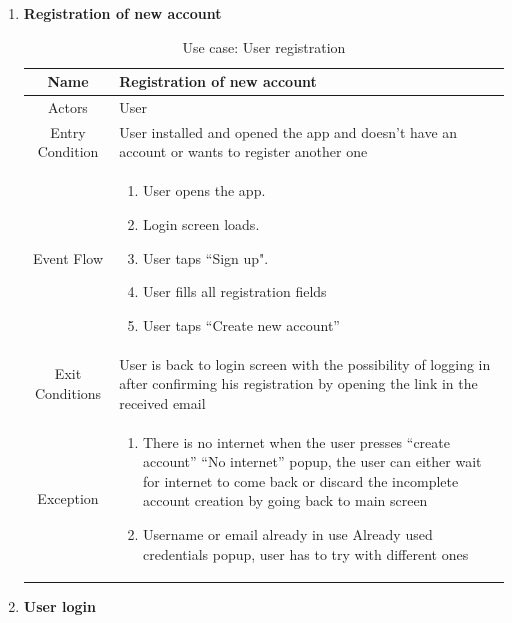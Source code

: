 \begin{enumerate}
	
\item \textbf{Registration of new account}

\begin{table}[H]
{
\begin{tabular}{|c|p{14cm}|}
	\hline
	Name & Registration of new account\\
	\hline
	Actors & User\\
	\hline
	Entry Condition & User installed and opened the app and doesn't have an account or wants to register another one\\
	\hline
	Event Flow & \begin{enumerate}
		\item User opens the app.
		\item Login screen loads.
		\item User taps “Sign up".
		\item User fills all registration fields
		\item User taps “Create new account”
		
		\end{enumerate}\\
	\hline
	Exit Conditions & User is back to login screen with the possibility of logging in after confirming his registration by opening the link in the received email	\\
	\hline
	Exception & \begin{enumerate}
		\item There is no internet when the user presses “create account”\newline
	“No internet” popup, the user can either wait for internet to come back or discard the incomplete account creation by going back to main screen
	\item Username or email already in use\newline
	Already used credentials popup, user has to try with different ones
\end{enumerate}\\
	\hline
\end{tabular}
}
	\label{tab:UCRegister}
	\caption{Use case: User registration}
\end{table}

\item \textbf{User login}
	

\end{enumerate}
